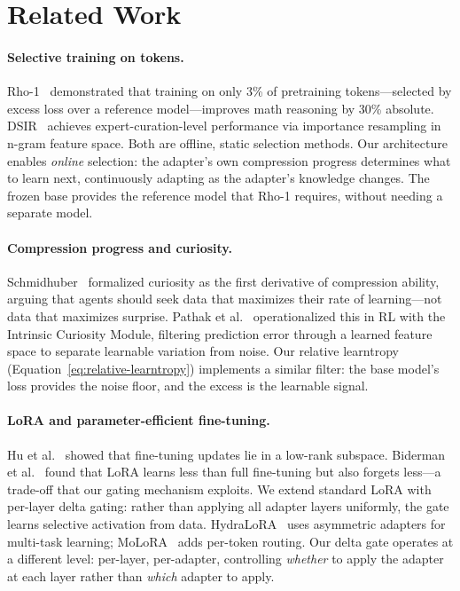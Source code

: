 \documentclass{article}
\begin{document}
\section{Related Work}
\label{sec:related}

\paragraph{Selective training on tokens.}
Rho-1~\cite{rho1_2024} demonstrated that training on only 3\% of
pretraining tokens---selected by excess loss over a reference
model---improves math reasoning by 30\% absolute. DSIR~\cite{xie2023dsir}
achieves expert-curation-level performance via importance resampling in
n-gram feature space. Both are offline, static selection methods. Our
architecture enables \emph{online} selection: the adapter's own
compression progress determines what to learn next, continuously
adapting as the adapter's knowledge changes. The frozen base provides
the reference model that Rho-1 requires, without needing a separate
model.

\paragraph{Compression progress and curiosity.}
Schmidhuber~\cite{schmidhuber2008} formalized curiosity as the first
derivative of compression ability, arguing that agents should seek data
that maximizes their rate of learning---not data that maximizes surprise.
Pathak et al.~\cite{pathak2017icm} operationalized this in RL with the
Intrinsic Curiosity Module, filtering prediction error through a learned
feature space to separate learnable variation from noise. Our relative
learntropy (Equation~\ref{eq:relative-learntropy}) implements a similar
filter: the base model's loss provides the noise floor, and the excess
is the learnable signal.

\paragraph{LoRA and parameter-efficient fine-tuning.}
Hu et al.~\cite{hu2022lora} showed that fine-tuning updates lie in a
low-rank subspace. Biderman et al.~\cite{biderman2024lora} found that
LoRA learns less than full fine-tuning but also forgets less---a
trade-off that our gating mechanism exploits. We extend standard LoRA
with per-layer delta gating: rather than applying all adapter layers
uniformly, the gate learns selective activation from data. HydraLoRA~\cite{hydralora2024} uses asymmetric adapters for multi-task
learning; MoLoRA~\cite{molora2026} adds per-token routing. Our delta
gate operates at a different level: per-layer, per-adapter, controlling
\emph{whether} to apply the adapter at each layer rather than
\emph{which} adapter to apply.
\end{document}
